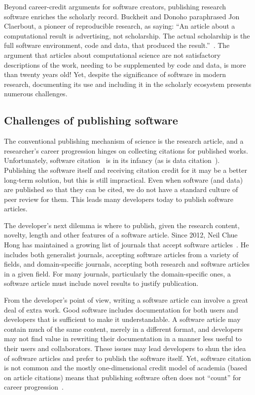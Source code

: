 \documentclass{article}
\begin{document}
Beyond career-credit arguments for software creators, publishing research software enriches the scholarly record. Buckheit and Donoho paraphrased Jon Claerbout, a pioneer of reproducible research, as saying: ``An article about a computational result is advertising, not scholarship. The actual scholarship is the full software environment, code and data, that produced the result.''~\cite{Buckheit1995}.
The argument that articles about computational science are not satisfactory descriptions of the work, needing to be supplemented by code and data, is more than twenty years old! Yet, despite the significance of software in modern research, documenting its use and including it in the scholarly ecosystem presents numerous challenges.


\subsection{Challenges of publishing software}


The conventional publishing mechanism of science is the research article, and a researcher's career progression hinges on collecting citations for published works.
Unfortunately, software citation~\cite{Smith2016} is in its infancy (as is data citation~\cite{data-citation,10.7717/peerj-cs.1}).
Publishing the software itself and receiving citation credit for it may be a better long-term solution, but this is still impractical.
Even when software (and data) are published so that they can be cited, we do not have a standard culture of peer review for them. This leads many developers today to publish software articles.


The developer's next dilemma is where to publish, given the research content, novelty, length and other features of a software article.
%
Since 2012, Neil Chue Hong has maintained a growing list of journals that accept software articles~\cite{software-papers-list}.
He includes both generalist journals, accepting software articles from a variety of fields, and domain-specific journals, accepting both research and software articles in a given field.
%
For many journals, particularly the domain-specific ones, a software article must include novel results to justify publication.

From the developer's point of view, writing a software article can involve a great deal of extra work. Good software includes documentation for both users and developers that is sufficient to make it understandable. A software article may contain much of the same content, merely in a different format, and developers may not find value in rewriting their documentation in a manner less useful to their users and collaborators.
These issues may lead developers to shun the idea of software articles and prefer to publish the software itself. Yet, software citation is not common and the mostly one-dimensional credit model of academia (based on article citations) means that publishing software often does not ``count'' for career progression~\cite{Smith2016,Niemeyer:2016sc}.
\end{document}
